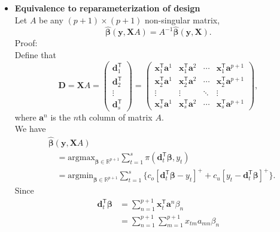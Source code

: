 \documentclass{article}
\begin{document}
\begin{itemize}
    \item \textbf{Equivalence to reparameterization of design}\\
    Let $A$ be any $(p+1)\times (p+1)$ non-singular matrix,
    \[
        \hat{\boldsymbol{\beta}}(\mathbf{y},\mathbf{X}A)=A^{-1}\hat{\boldsymbol{\beta}}(\mathbf{y},\mathbf{X}).
    \]
    Proof:\\
    Define that
    \[
        \mathbf{D}=\mathbf{X}A
        =\begin{pmatrix}
            \mathbf{d}_1^{\mathsf{T}}\\
            \mathbf{d}_2^{\mathsf{T}}\\
            \vdots\\
            \mathbf{d}_s^{\mathsf{T}}
        \end{pmatrix}
        =\begin{pmatrix}
            \mathbf{x}_{1}^{\mathsf{T}}\mathbf{a}^1&\mathbf{x}_1^{\mathsf{T}}\mathbf{a}^2&\cdots &\mathbf{x}_1^{\mathsf{T}}\mathbf{a}^{p+1}\\
            \mathbf{x}_2^{\mathsf{T}}\mathbf{a}^1&\mathbf{x}_2^{\mathsf{T}}\mathbf{a}^2&\cdots &\mathbf{x}_2^{\mathsf{T}}\mathbf{a}^{p+1}\\
            \vdots &\vdots &\ddots &\vdots \\
            \mathbf{x}_s^{\mathsf{T}}\mathbf{a}^1&\mathbf{x}_s^{\mathsf{T}}\mathbf{a}^2&\cdots &\mathbf{x}_s^{\mathsf{T}}\mathbf{a}^{p+1}
        \end{pmatrix},
    \]
    where $\mathbf{a}^n$ is the $n$th column of matrix $A$.\\
    We have
    \[
        \begin{aligned}
            &\hat{\boldsymbol{\beta}}(\mathbf{y},\mathbf{X}A)\\
            &\quad=\text{argmax}_{\boldsymbol{\beta}\in \mathbb{R}^{p+1}}\displaystyle\sum_{t=1}^s{\pi(\mathbf{d}_t^{\mathsf{T}}\boldsymbol{\beta},y_t)}\\
            &\quad=\text{argmin}_{\boldsymbol{\beta}\in \mathbb{R}^{p+1}}\displaystyle\sum_{t=1}^s{\{c_o[\mathbf{d}_t^{\mathsf{T}}\boldsymbol{\beta}-y_t]^{+}+c_u[y_t-\mathbf{d}_t^{\mathsf{T}}\boldsymbol{\beta}]^{+}\}}.
        \end{aligned}
    \]
    Since
    \[
        \begin{aligned}
            \mathbf{d}_t^{\mathsf{T}}\boldsymbol{\beta}
            &=\displaystyle\sum_{n=1}^{p+1}\mathbf{x}_t^{\mathsf{T}}\mathbf{a}^n\beta_n\\
            &=\displaystyle\sum_{n=1}^{p+1}\displaystyle\sum_{m=1}^{p+1}x_{tm}a_{mn}\beta_n\\

\end{aligned}\]
\end{itemize}
\end{document}
